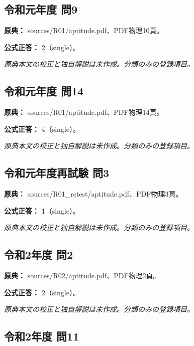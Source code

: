 \subsection{令和元年度 問9}
\label{q:r01-reg-apt-09}

\noindent\textbf{原典：} sources/R01/aptitude.pdf、PDF物理10頁。

\textbf{公式正答：} 2（single）。

\par\textit{原典本文の校正と独自解説は未作成。分類のみの登録項目。}

\subsection{令和元年度 問14}
\label{q:r01-reg-apt-14}

\noindent\textbf{原典：} sources/R01/aptitude.pdf、PDF物理14頁。

\textbf{公式正答：} 4（single）。

\par\textit{原典本文の校正と独自解説は未作成。分類のみの登録項目。}

\subsection{令和元年度再試験 問3}
\label{q:r01-ret-apt-03}

\noindent\textbf{原典：} sources/R01\_retest/aptitude.pdf、PDF物理3頁。

\textbf{公式正答：} 1（single）。

\par\textit{原典本文の校正と独自解説は未作成。分類のみの登録項目。}

\subsection{令和2年度 問2}
\label{q:r02-reg-apt-02}

\noindent\textbf{原典：} sources/R02/aptitude.pdf、PDF物理2頁。

\textbf{公式正答：} 2（single）。

\par\textit{原典本文の校正と独自解説は未作成。分類のみの登録項目。}

\subsection{令和2年度 問11}
\label{q:r02-reg-apt-11}

